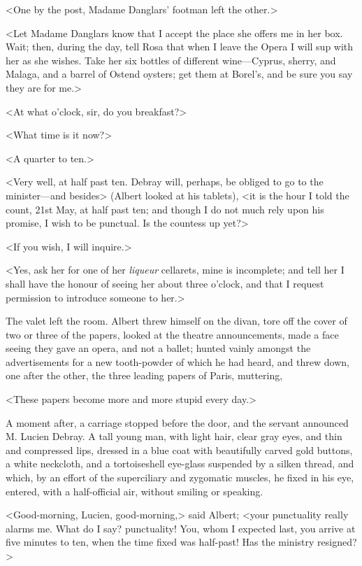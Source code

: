  <One by the post, Madame Danglars' footman left the other.> 

 <Let Madame Danglars know that I accept the place she offers me in her box. Wait; then, during the day, tell Rosa that when I leave the Opera I will sup with her as she wishes. Take her six bottles of different wine—Cyprus, sherry, and Malaga, and a barrel of Ostend oysters; get them at Borel's, and be sure you say they are for me.> 

 <At what o'clock, sir, do you breakfast?>

<What time is it now?> 

 <A quarter to ten.> 

 <Very well, at half past ten. Debray will, perhaps, be obliged to go to the minister—and besides> (Albert looked at his tablets), <it is the hour I told the count, 21st May, at half past ten; and though I do not much rely upon his promise, I wish to be punctual. Is the countess up yet?> 

 <If you wish, I will inquire.> 

 <Yes, ask her for one of her \textit{liqueur} cellarets, mine is incomplete; and tell her I shall have the honour of seeing her about three o'clock, and that I request permission to introduce someone to her.> 

 The valet left the room. Albert threw himself on the divan, tore off the cover of two or three of the papers, looked at the theatre announcements, made a face seeing they gave an opera, and not a ballet; hunted vainly amongst the advertisements for a new tooth-powder of which he had heard, and threw down, one after the other, the three leading papers of Paris, muttering, 

 <These papers become more and more stupid every day.> 

 A moment after, a carriage stopped before the door, and the servant announced M. Lucien Debray. A tall young man, with light hair, clear gray eyes, and thin and compressed lips, dressed in a blue coat with beautifully carved gold buttons, a white neckcloth, and a tortoiseshell eye-glass suspended by a silken thread, and which, by an effort of the superciliary and zygomatic muscles, he fixed in his eye, entered, with a half-official air, without smiling or speaking. 

 <Good-morning, Lucien, good-morning,> said Albert; <your punctuality really alarms me. What do I say? punctuality! You, whom I expected last, you arrive at five minutes to ten, when the time fixed was half-past! Has the ministry resigned?> 

